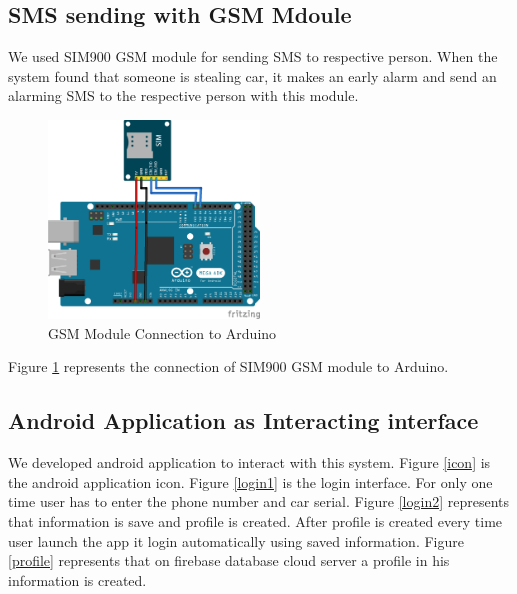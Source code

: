 \subsection{SMS sending with GSM Mdoule}
We used SIM900 GSM module for sending SMS to respective person. When the system found that someone is stealing car, it makes an early alarm and send an alarming SMS to the respective person with this module.

\begin{figure}[H]
\centering
\includegraphics[width=0.5\textwidth]{figures/gsm_bb.png}
\caption{GSM Module Connection to Arduino}
\label{gsm}
\end{figure}
Figure \ref{gsm} represents the connection of SIM900 GSM module to Arduino.

\subsection{Android Application as Interacting interface}
We developed android application to interact with this system. Figure \ref{icon} is the android application icon. Figure \ref{login1} is the login interface. For only one time user has to enter the phone number and car serial. Figure \ref{login2} represents that information is save and profile is created. After profile is created every time user launch the app it login automatically using saved information. Figure \ref{profile} represents that on firebase database cloud server a profile in his information is created.

